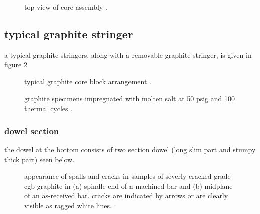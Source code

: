 \documentclass{article}
\newcommand*{\mrsarchive}{../../msr-archive}%
\begin{document}
\begin{figure}[H]
  \centering
  \centering
  \caption{top view of core assembly \parencite[figure 1.4]{ornl-4676}.}
  \label{4676-fig1-6}
\end{figure}

\subsection{typical graphite stringer}
a typical graphite stringers, along with a removable graphite stringer, is given in figure \ref{3229-fig2}
\begin{figure}[H]
  \centering
  \centering
  \caption{typical graphite core block arrangement \parencite[figure 2]{ornl-tm-3229}.}
  \label{3229-fig2}
\end{figure}

\begin{figure}[H]
  \centering
  \caption{graphite specimens impregnated with molten salt at
50 psig and 100 thermal cycles \parencite[figure 4.3]{ornl-3419}.}
\end{figure}

\subsubsection{dowel section}
the dowel at the bottom consists of two section dowel (long slim part and stumpy thick part) seen below.
\begin{figure}[H]
  \centering
  \caption{appearance of spalls and cracks in samples of severly cracked grade cgb graphite in (a) spindle end of a machined bar and (b) midplane of an as-received bar. cracks are indicated by arrows or are clearly visible as ragged white lines. \parencite[figure 4]{ornl-3708}.}
  \label{3708-fig4}
\end{figure}
\end{document}
